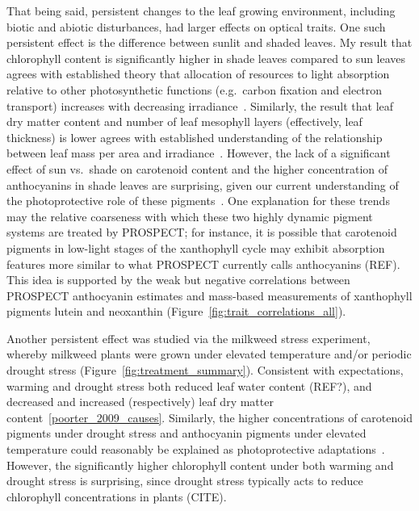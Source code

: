 That being said, persistent changes to the leaf growing environment, including biotic and abiotic disturbances, had larger effects on optical traits.
One such persistent effect is the difference between sunlit and shaded leaves.
My result that chlorophyll content is significantly higher in shade leaves compared to sun leaves agrees with established theory that allocation of resources to light absorption relative to other photosynthetic functions (e.g.\ carbon fixation and electron transport) increases with decreasing irradiance~\cite{hikosaka_1995_model}.
Similarly, the result that leaf dry matter content and number of leaf mesophyll layers (effectively, leaf thickness) is lower agrees with established understanding of the relationship between leaf mass per area and irradiance~\cite{poorter_2009_causes}.
However, the lack of a significant effect of sun vs.\ shade on carotenoid content and the higher concentration of anthocyanins in shade leaves are surprising, given our current understanding of the photoprotective role of these pigments~\cite{young_1991_photoprotective,steyn_2002_anthocyanins}.
One explanation for these trends may the relative coarseness with which these two highly dynamic pigment systems are treated by PROSPECT\@;
for instance, it is possible that carotenoid pigments in low-light stages of the xanthophyll cycle may exhibit absorption features more similar to what PROSPECT currently calls anthocyanins (REF). %
This idea is supported by the weak but negative correlations between PROSPECT anthocyanin estimates and mass-based measurements of xanthophyll pigments lutein and neoxanthin (Figure~\ref{fig:trait_correlations_all}).

Another persistent effect was studied via the milkweed stress experiment, whereby milkweed plants were grown under elevated temperature and/or periodic drought stress (Figure~\ref{fig:treatment_summary}).
Consistent with expectations, warming and drought stress both reduced leaf water content (REF?), and decreased and increased (respectively) leaf dry matter content~\ref{poorter_2009_causes}.
Similarly, the higher concentrations of carotenoid pigments under drought stress and anthocyanin pigments under elevated temperature could reasonably be explained as photoprotective adaptations~\cite{young_1991_photoprotective,steyn_2002_anthocyanins}.
However, the significantly higher chlorophyll content under both warming and drought stress is surprising, since drought stress typically acts to reduce chlorophyll concentrations in plants (CITE).

